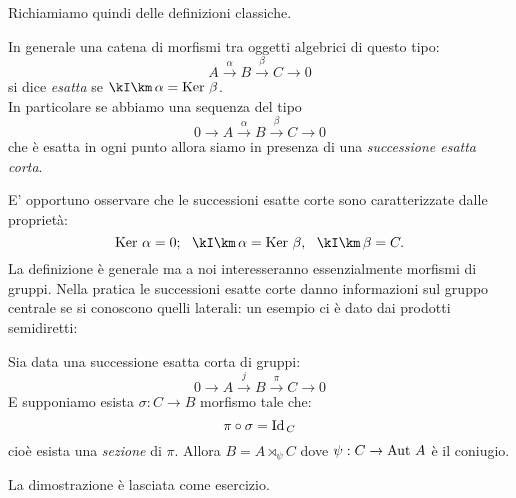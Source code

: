 Richiamiamo quindi delle definizioni classiche.

\begin{definizione} In generale una catena di morfismi tra oggetti algebrici di questo tipo:
$$
A\xrightarrow{\alpha}B\xrightarrow{\beta}C\rightarrow 0
$$
si dice {\it esatta} se $\Im{\alpha}=\Ker{\beta}$.\\
In particolare se abbiamo una sequenza del tipo
$$
0\rightarrow A\xrightarrow{\alpha}B\xrightarrow{\beta}C \rightarrow 0
$$
che è esatta in ogni punto allora siamo in presenza di una {\it successione esatta corta}.
\end{definizione}
E' opportuno osservare che le successioni esatte corte sono caratterizzate dalle proprietà:
$$
\Ker \alpha =0;\ \ \Im \alpha =\Ker \beta,\ \ \Im \beta =C.
$$
La definizione è generale ma a noi interesseranno essenzialmente morfismi di gruppi.
Nella pratica le successioni esatte corte danno informazioni sul gruppo centrale se si conoscono quelli laterali: un esempio ci è dato dai prodotti semidiretti:
\begin{fatto}
Sia data una successione esatta corta di gruppi:
$$
0\rightarrow A\xrightarrow{j}B\xrightarrow{\pi}C \rightarrow 0
$$
E supponiamo esista $\sigma:C\rightarrow B$ morfismo tale che:
$$
\pi\circ \sigma=\text{Id}_{\, C}
$$
cioè esista  una {\it sezione} di $\pi$. Allora $B=A\rtimes_\psi C$ dove $\psi:C
\rightarrow \text{Aut } A$ è il coniugio.
\end{fatto}
La dimostrazione è lasciata come esercizio.

